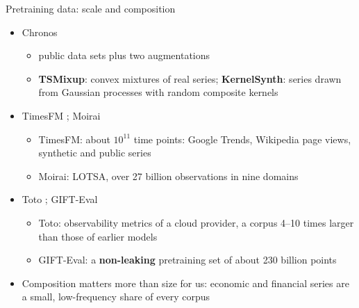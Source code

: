 \begin{frame}{Pretraining data: scale and composition}
\itemsize{\small}
\begin{itemize}
    \item Chronos 
    \begin{itemize}
        \item public data sets plus two augmentations
        \item \textbf{TSMixup}: convex mixtures of real series; \textbf{KernelSynth}: series drawn from Gaussian processes with random composite kernels
    \end{itemize}
    \item TimesFM ; Moirai 
    \begin{itemize}
        \item TimesFM: about $10^{11}$ time points: Google Trends, Wikipedia page views, synthetic and public series
        \item Moirai: LOTSA, over 27 billion observations in nine domains
    \end{itemize}
    \item Toto ; GIFT-Eval 
    \begin{itemize}
        \item Toto: observability metrics of a cloud provider, a corpus 4--10 times larger than those of earlier models
        \item GIFT-Eval: a \textbf{non-leaking} pretraining set of about 230 billion points
    \end{itemize}
    \item Composition matters more than size for us: economic and financial series are a small, low-frequency share of every corpus
\end{itemize}
\end{frame}

